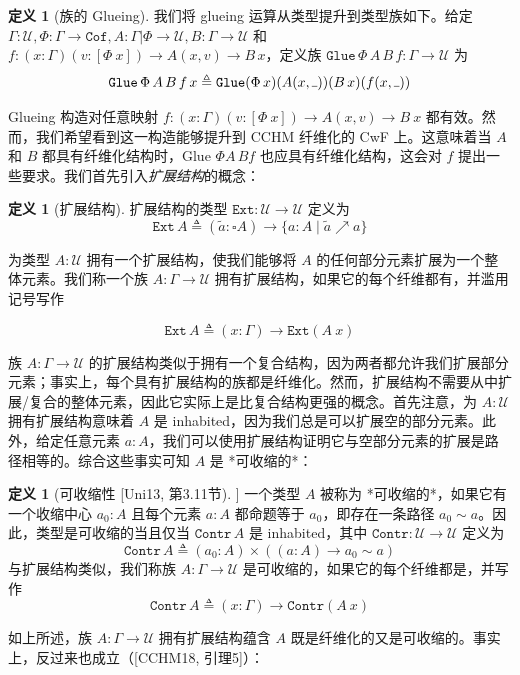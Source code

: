 \documentclass{ctexart}
\theoremstyle{plain}
\theoremstyle{definition}
\newtheorem{definition}[theorem]{定义}
\theoremstyle{definition}
\theoremstyle{definition}
\theoremstyle{definition}
\newcommand{\ul}{{\rule[0ex]{0.4em}{0.4pt}}} %
\numberwithin{equation}{section}
\begin{document}
\begin{definition}[族的 Glueing]
  我们将 glueing 运算从类型提升到类型族如下。给定 $ \Gamma : \mathcal{U}, \Phi : \Gamma \to \mathtt{Cof}, A : \Gamma |\Phi \to \mathcal{U}, B : \Gamma \to \mathcal{U} $ 和 $ f : (x : \Gamma)(v : [\Phi\ x]) \to A(x, v) \to B\,x $，定义族 $ \mathtt{Glue} \, \Phi \, A \, B \, f : \Gamma \to \mathcal{U} $ 为
\begin{equation} \mathtt{Glue} \, \Phi \, A \, B \, f \, x \triangleq \mathtt{Glue}(\Phi \, x)(A(x, \ul))(B \, x)(f(x, \ul)) \end{equation}
\end{definition}
Glueing 构造对任意映射 $ f : (x : \Gamma)(v : [\Phi\ x]) \to A(x, v) \to B\ x $ 都有效。然而，我们希望看到这一构造能够提升到 CCHM 纤维化的 CwF 上。这意味着当 $ A $ 和 $ B $ 都具有纤维化结构时，Glue $ \Phi A\,Bf $ 也应具有纤维化结构，这会对 $ f $ 提出一些要求。我们首先引入\textit{扩展结构}的概念：

\begin{definition}[扩展结构]
  扩展结构的类型 $ \mathtt{Ext} : \mathcal{U} \to \mathcal{U} $ 定义为
\[ \mathtt{Ext}\,A \triangleq (\tilde{a} : \square A) \to \{a : A \mid \tilde{a} \nearrow a\} \]
\end{definition}
为类型 $ A : \mathcal{U} $ 拥有一个扩展结构，使我们能够将 $ A $ 的任何部分元素扩展为一个整体元素。我们称一个族 $ A : \Gamma \to \mathcal{U} $ 拥有扩展结构，如果它的每个纤维都有，并滥用记号写作

\[ \mathtt{Ext}\,A \triangleq (x : \Gamma) \to \mathtt{Ext}(A\ x) \]

族 $ A : \Gamma \to \mathcal{U} $ 的扩展结构类似于拥有一个复合结构，因为两者都允许我们扩展部分元素；事实上，每个具有扩展结构的族都是纤维化。然而，扩展结构不需要从中扩展/复合的整体元素，因此它实际上是比复合结构更强的概念。首先注意，为 $ A : \mathcal{U} $ 拥有扩展结构意味着 $ A $ 是 inhabited，因为我们总是可以扩展空的部分元素。此外，给定任意元素 $ a : A $，我们可以使用扩展结构证明它与空部分元素的扩展是路径相等的。综合这些事实可知 $ A $ 是 *可收缩的*：

\begin{definition}[可收缩性 [Uni13, 第3.11节]]
  一个类型 $ A $ 被称为 *可收缩的*，如果它有一个收缩中心 $ a_0 : A $ 且每个元素 $ a : A $ 都命题等于 $ a_0 $，即存在一条路径 $ a_0 \sim a $。因此，类型是可收缩的当且仅当 $ \mathtt{Contr}\,A $ 是 inhabited，其中 $ \mathtt{Contr} : \mathcal{U} \to \mathcal{U} $ 定义为
\[ \mathtt{Contr}\,A \triangleq (a_0 : A) \times ((a : A) \to a_0 \sim a) \]
与扩展结构类似，我们称族 $ A : \Gamma \to \mathcal{U} $ 是可收缩的，如果它的每个纤维都是，并写作
\[ \mathtt{Contr}\,A \triangleq (x : \Gamma) \to \mathtt{Contr}(A\ x) \]
\end{definition}
如上所述，族 $ A : \Gamma \to \mathcal{U} $ 拥有扩展结构蕴含 $ A $ 既是纤维化的又是可收缩的。事实上，反过来也成立（[CCHM18, 引理5]）：
\end{document}
